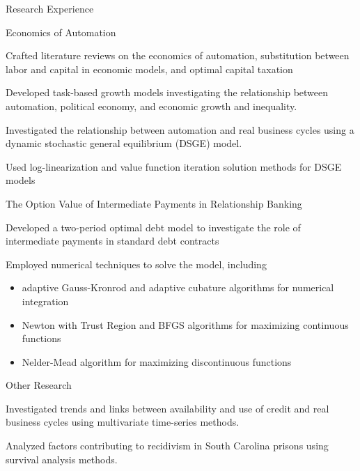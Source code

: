 \documentclass{resume} %
\begin{document}
\begin{rSection}{Research Experience}
    \begin{rSubsection}{Economics of Automation}{}{}{}
        \item Crafted literature reviews on the economics of automation, substitution between labor and capital in economic models, and optimal capital taxation
        \item Developed task-based growth models investigating the relationship between automation, political economy, and economic growth and inequality.
        \item Investigated the relationship between automation and real business cycles using a dynamic stochastic general equilibrium (DSGE) model.
        \item Used log-linearization and value function iteration solution methods for DSGE models
    \end{rSubsection}

    \begin{rSubsection}{The Option Value of Intermediate Payments in Relationship Banking}{}{}{}
        \item Developed a two-period optimal debt model to investigate the role of intermediate payments in standard debt contracts
        \item Employed numerical techniques to solve the model, including 
        \begin{itemize}
            \item adaptive Gauss-Kronrod and adaptive cubature algorithms for numerical integration
            \item Newton with Trust Region and BFGS algorithms for maximizing continuous functions
            \item Nelder-Mead algorithm for maximizing discontinuous functions
        \end{itemize}
    \end{rSubsection}

    \begin{rSubsection}{Other Research}{}{}{}
        \item Investigated trends and links between availability and use of credit and real business cycles using multivariate time-series methods.
        \item Analyzed factors contributing to recidivism in South Carolina prisons using survival analysis methods.
    \end{rSubsection}
\end{rSection}
\end{document}
